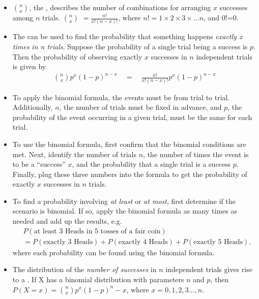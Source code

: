 \begin{itemize}
\item $n\choose x$, the , describes the number of combinations for arranging $x$ successes among $n$ trials.  $n\choose x$ $=\frac{n!}{x!(n-x)!}$, where $n!=1\times 2\times 3\times...n$, and $0!$=0.

\item The  can be used to find the probability that something happens \textit{exactly x times in n trials}.  Suppose the probability of a single trial being a success is $p$. Then the probability of observing exactly $x$ successes in $n$ independent trials is given by\vspace{-1mm}
\begin{eqnarray*}
{n\choose x}p^x(1-p)^{n-x}   \quad= \quad  \frac{n!}{x!(n-x)!}p^x(1-p)^{n-x}
\end{eqnarray*}

\item To apply the binomial formula, the events must be  from trial to trial.  Additionally, $n$, the number of trials must be fixed in advance, and $p$, the probability of the event occurring in a given trial, must be the same for each trial.

\item To use the binomial formula, first confirm that the binomial conditions are met.  Next, identify the number of trials $n$, the number of times the event is to be a ``success'' $x$, and the probability that a single trial is a success $p$. Finally, plug these three numbers into the formula to get the probability of exactly $x$ successes in $n$ trials.


\item
  To find a probability involving \emph{at least} or \emph{at most},
  first determine if the scenario is binomial.
  If so, apply the binomial formula as many times as needed and add
  up the results, e.g.
  \begin{align*}
  &P(\text{at least 3 Heads in 5 tosses of a fair coin}) \\
    &= P(\text{exactly 3 Heads})+P(\text{exactly 4 Heads})+P(\text{exactly 5 Heads}),
  \end{align*}
  where each probability can be found using the binomial formula.


\item The distribution of the \textit{number of successes} in $n$ independent trials gives rise to a .  If X has a binomial distribution with parameters $n$ and $p$, then \\
$P(X=x) = {n\choose x}p^x(1-p)^n-x$, where $x=0,1,2,3\dots,n$.


\end{itemize}
